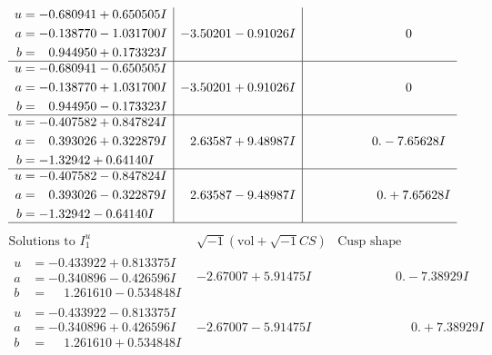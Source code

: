 \documentclass[1p]{elsarticle_modified}
\theoremstyle{definition}
\newcommand{\I}{\sqrt{-1}}
\begin{document}
$$\begin{array}{c|c|c}
\begin{aligned}
u &= -0.680941 + 0.650505 I \\
a &= -0.138770 - 1.031700 I \\
b &= \phantom{-}0.944950 + 0.173323 I\end{aligned}
 & -3.50201 - 0.91026 I & \phantom{-0.000000 } 0 \\ \hline\begin{aligned}
u &= -0.680941 - 0.650505 I \\
a &= -0.138770 + 1.031700 I \\
b &= \phantom{-}0.944950 - 0.173323 I\end{aligned}
 & -3.50201 + 0.91026 I & \phantom{-0.000000 } 0 \\ \hline\begin{aligned}
u &= -0.407582 + 0.847824 I \\
a &= \phantom{-}0.393026 + 0.322879 I \\
b &= -1.32942 + 0.64140 I\end{aligned}
 & \phantom{-}2.63587 + 9.48987 I & \phantom{-0.000000 } 0. - 7.65628 I \\ \hline\begin{aligned}
u &= -0.407582 - 0.847824 I \\
a &= \phantom{-}0.393026 - 0.322879 I \\
b &= -1.32942 - 0.64140 I\end{aligned}
 & \phantom{-}2.63587 - 9.48987 I & \phantom{-0.000000 -}0. + 7.65628 I\\
 \hline 
 \end{array}$$\newpage$$\begin{array}{c|c|c}  
\text{Solutions to }I^u_{1}& \I (\text{vol} + \sqrt{-1}CS) & \text{Cusp shape}\\
 \hline 
\begin{aligned}
u &= -0.433922 + 0.813375 I \\
a &= -0.340896 - 0.426596 I \\
b &= \phantom{-}1.261610 - 0.534848 I\end{aligned}
 & -2.67007 + 5.91475 I & \phantom{-0.000000 } 0. - 7.38929 I \\ \hline\begin{aligned}
u &= -0.433922 - 0.813375 I \\
a &= -0.340896 + 0.426596 I \\
b &= \phantom{-}1.261610 + 0.534848 I\end{aligned}
 & -2.67007 - 5.91475 I & \phantom{-0.000000 -}0. + 7.38929 I \\ \hline\begin{aligned}

\end{aligned}
\end{array}$$
\end{document}
